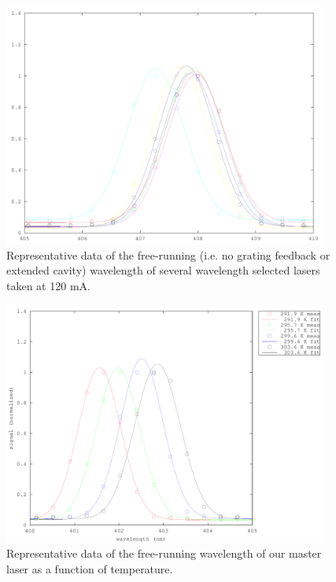 \begin{figure}
\centering
\includegraphics[width=0.95\textwidth]{wavelength_selected} 
\caption[Wavelength selected diodes]{\label{wavelengthselected} Representative data of the free-running (i.e. no grating feedback or extended cavity) wavelength of several wavelength selected lasers taken at 120 mA.} %
\end{figure}
\begin{figure}
\centering
\includegraphics[width=0.95\textwidth]{temperatureFit} 
\caption[Wavelength of master laser at different temperatures]{\label{Temperaturespectra} Representative data of the free-running wavelength of our master laser as a function of temperature.}
\end{figure}

